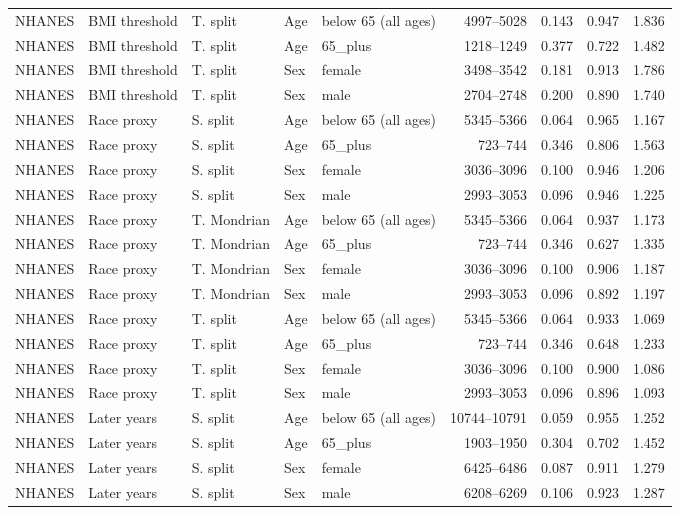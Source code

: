 \begin{longtable}{L{0.9cm}L{1.55cm}L{1.45cm}L{1.1cm}L{1.8cm}r r r r}
NHANES & BMI threshold & T. split & Age & below 65 (all ages) & 4997--5028 & 0.143 & 0.947 & 1.836 \\
NHANES & BMI threshold & T. split & Age & 65\_plus & 1218--1249 & 0.377 & 0.722 & 1.482 \\
NHANES & BMI threshold & T. split & Sex & female & 3498--3542 & 0.181 & 0.913 & 1.786 \\
NHANES & BMI threshold & T. split & Sex & male & 2704--2748 & 0.200 & 0.890 & 1.740 \\
NHANES & Race proxy & S. split & Age & below 65 (all ages) & 5345--5366 & 0.064 & 0.965 & 1.167 \\
NHANES & Race proxy & S. split & Age & 65\_plus & 723--744 & 0.346 & 0.806 & 1.563 \\
NHANES & Race proxy & S. split & Sex & female & 3036--3096 & 0.100 & 0.946 & 1.206 \\
NHANES & Race proxy & S. split & Sex & male & 2993--3053 & 0.096 & 0.946 & 1.225 \\
NHANES & Race proxy & T. Mondrian & Age & below 65 (all ages) & 5345--5366 & 0.064 & 0.937 & 1.173 \\
NHANES & Race proxy & T. Mondrian & Age & 65\_plus & 723--744 & 0.346 & 0.627 & 1.335 \\
NHANES & Race proxy & T. Mondrian & Sex & female & 3036--3096 & 0.100 & 0.906 & 1.187 \\
NHANES & Race proxy & T. Mondrian & Sex & male & 2993--3053 & 0.096 & 0.892 & 1.197 \\
NHANES & Race proxy & T. split & Age & below 65 (all ages) & 5345--5366 & 0.064 & 0.933 & 1.069 \\
NHANES & Race proxy & T. split & Age & 65\_plus & 723--744 & 0.346 & 0.648 & 1.233 \\
NHANES & Race proxy & T. split & Sex & female & 3036--3096 & 0.100 & 0.900 & 1.086 \\
NHANES & Race proxy & T. split & Sex & male & 2993--3053 & 0.096 & 0.896 & 1.093 \\
NHANES & Later years & S. split & Age & below 65 (all ages) & 10744--10791 & 0.059 & 0.955 & 1.252 \\
NHANES & Later years & S. split & Age & 65\_plus & 1903--1950 & 0.304 & 0.702 & 1.452 \\
NHANES & Later years & S. split & Sex & female & 6425--6486 & 0.087 & 0.911 & 1.279 \\
NHANES & Later years & S. split & Sex & male & 6208--6269 & 0.106 & 0.923 & 1.287 \\

\end{longtable}
